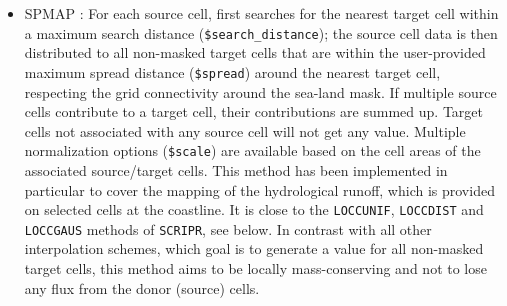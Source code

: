 \begin{itemize}
\item SPMAP : For each source cell, first searches for the nearest target cell within a maximum search
distance ({\tt \$search\_distance}); the source cell data is then distributed to all non-masked target cells
that are within the user-provided maximum spread distance ({\tt \$spread}) around the nearest
target cell, respecting the grid connectivity around the sea-land mask. If multiple source cells
contribute to a target cell, their contributions are summed up. Target cells not associated with any
source cell will not get any value. Multiple normalization options ({\tt \$scale}) are available
based on the cell areas of the associated source/target cells.
This method has been implemented in particular to cover the mapping of the hydrological runoff, which is provided on selected cells at the coastline. It is close to the {\tt LOCCUNIF},  {\tt LOCCDIST} and  {\tt LOCCGAUS} methods of  {\tt SCRIPR}, see below. In contrast with all other interpolation
schemes, which goal is to generate a value for all non-masked target cells, this method aims to be
locally mass-conserving and not to lose any flux from the donor (source) cells.


\end{itemize}
